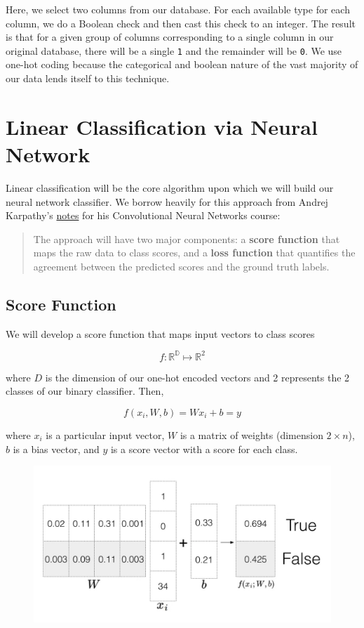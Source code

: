 \documentclass[]{report}
\begin{document}
Here, we select two columns from our database. For each available type
for each column, we do a Boolean check and then cast this check to an
integer. The result is that for a given group of columns corresponding
to a single column in our original database, there will be a single
\texttt{1} and the remainder will be \texttt{0}. We use one-hot coding
because the categorical and boolean nature of the vast majority of our
data lends itself to this technique.

\chapter{Linear Classification via Neural
Network}\label{linear-classification-via-neural-network}

Linear classification will be the core algorithm upon which we will
build our neural network classifier. We borrow heavily for this approach
from Andrej Karpathy's
\href{http://cs231n.github.io/linear-classify/}{notes} for his
Convolutional Neural Networks course:

\begin{quote}
The approach will have two major components: a \textbf{score function}
that maps the raw data to class scores, and a \textbf{loss function}
that quantifies the agreement between the predicted scores and the
ground truth labels.
\end{quote}

\section{Score Function}\label{score-function}

We will develop a score function that maps input vectors to class scores

\[f: \mathbb{R^D} \mapsto \mathbb{R}^2\]

where \(D\) is the dimension of our one-hot encoded vectors and 2
represents the 2 classes of our binary classifier. Then,

\[f(x_i, W, b)=Wx_i+b=y\]

where \(x_i\) is a particular input vector, \(W\) is a matrix of weights
(dimension \(2 \times n\)), \(b\) is a bias vector, and \(y\) is a score
vector with a score for each class.

\begin{figure}[htbp]
\centering
\includegraphics{assets/img/Linearclassifier.jpg}
\caption{}
\end{figure}
\end{document}
